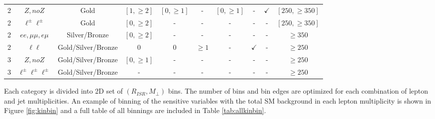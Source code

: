 \begin{table}
\begin{adjustwidth}{-0.7in}{-1in}
\begin{tabular}{|c|c|c|c|c|c|c|c|c|c|}
2 & $Z, no Z$ & Gold & $[1,\geq 2]$ & $[0, \geq 1]$& - & $[0,\geq 1]$ & - & $\checkmark$ & $[250,\geq350]$  \\
2 & $\ell^\pm \ell^\pm$ & Gold & $[0,\geq 2]$ & - & - &  - & - & - & $[250,\geq350]$ \\
2 & $ee, \mu\mu, e\mu$ & Silver/Bronze & $[0,\geq 2]$ & - & - & - & - & - & $\geq350$ \\
2 & $\ell \ell$ & Gold/Silver/Bronze & 0 & 0 & $\geq 1 $ & - & $\checkmark$ & - & $\geq 250$\\
\hline
3 & $Z, no Z$ & Gold/Silver/Bronze & $[0,\geq 1]$ & - & - & - & - & - & $\geq 250$ \\
3 & $\ell^\pm \ell^\pm \ell^\pm$ & Gold/Silver/Bronze & - & - & -& - & - & -& $\geq 250$ \\
\hline
\end{tabular} 
\end{adjustwidth}
\label{tab:cats}
\end{table}



Each category is divided into 2D set of $(R_{ISR}, M_\perp)$ bins. The number of bins and bin edges are optimized for each combination of lepton and jet multiplicities. An example of binning of the sensitive variables with the total SM background in each lepton multiplicity is shown in Figure \ref{fig:kinbin} and a full table of all binnings are included in Table \ref{tab:allkinbin}.

